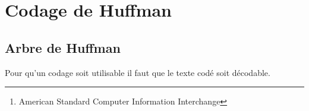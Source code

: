\chapter{Codage de Huffman}
\thispagestyle{empty}
\begin{abstract}
Pour coder les chaînes de caractères, le code le plus répandu est le code ASCII\footnote{\sc American Standard
Computer Information Interchange}. Dans ce code, chaque caractère est codé par un octet, c'est-à-dire par un mot de 8 bits. Un texte de $n$ caractères est donc codé sur $8n$ bits.

Il est parfois utile de comprimer le codage : une méthode possible consiste à coder les caractères les plus fréquents des mots de longueur inférieure à 8, alors que d'autres seront codés par des mots plus longs. L'idée est que la longueur
moyenne d'un texte de $n$ caractères pourrait être alors strictement inférieure à $8n$.

Une telle méthode est proposée par le codage de Huffman.
\end{abstract}
\section{Arbre de Huffman}
Pour qu'un codage soit utilisable il faut que le texte codé soit décodable.

